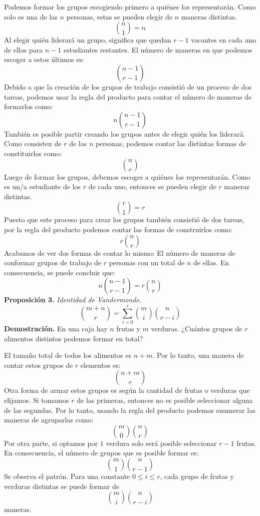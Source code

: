 \documentclass[12pt]{article}
\begin{document}
Podemos formar los grupos escogiendo primero a quiénes los representarán. Como solo es una de las $n$ personas, estas se pueden elegir de $n$ maneras distintas.
\[
  \binom{n}{1} = n
\]
Al elegir quién liderará un grupo, significa que quedan $r - 1$ vacantes en cada uno de ellos para $n - 1$ estudiantes restantes. El número de maneras en que podemos escoger a estos últimos es:
\[
  \binom{n - 1}{r - 1}
\]
Debido a que la creación de los grupos de trabajo consistió de un proceso de dos tareas, podemos usar la regla del producto para contar el número de maneras de formarlos como:
\[
  n \binom{n - 1}{r - 1}
\]
También es posible partir creando los grupos antes de elegir quién los liderará. Como consisten de $r$ de las $n$ personas, podemos contar las distintas formas de constituirlos como:
\[
  \binom{n}{r}
\]
Luego de formar los grupos, debemos escoger a quiénes los representarán. Como es un/a estudiante de los $r$ de cada uno, entonces se pueden elegir de $r$ maneras distintas.
\[
  \binom{r}{1} = r
\]
Puesto que este proceso para crear los grupos también consistió de dos tareas, por la regla del producto podemos contar las formas de construirlos como:
\[
  r \binom{n}{r}
\]
Acabamos de ver dos formas de contar lo mismo: El número de maneras de conformar grupos de trabajo de $r$ personas con un total de $n$ de ellas. En consecuencia, se puede concluir que:
\[
  n \binom{n - 1}{r - 1} = r \binom{n}{r}
\]
\textbf{Proposición 3.} \textit{Identidad de Vandermonde}.
\[
  \binom{m + n}{r} = \sum_{i = 0}^{r} \binom{m}{i} \binom{n}{r - i}
\]
\textbf{Demostración.} En una caja hay $n$ frutas y $m$ verduras. ¿Cuántos grupos de $r$ alimentos distintos podemos formar en total?

El tamaño total de todos los alimentos es $n + m$. Por lo tanto, una manera de contar estos grupos de $r$ elementos es:
\[
  \binom{n + m}{r}
\]
Otra forma de armar estos grupos es según la cantidad de frutas o verduras que elijamos. Si tomamos $r$ de las primeras, entonces no es posible seleccionar alguna de las segundas. Por lo tanto, usando la regla del producto podemos enumerar las maneras de agruparlas como:
\[
  \binom{m}{0} \binom{n}{r}
\]
Por otra parte, si optamos por $1$ verdura solo será posible seleccionar $r - 1$ frutas. En consecuencia, el número de grupos que es posible formar es:
\[
  \binom{m}{1} \binom{n}{r - 1}
\]
Se observa el patrón. Para una constante $0 \leq i \leq r$, cada grupo de frutas y verduras distintas se puede formar de
\[
  \binom{m}{i} \binom{n}{r - i}
\]
maneras.
\end{document}
